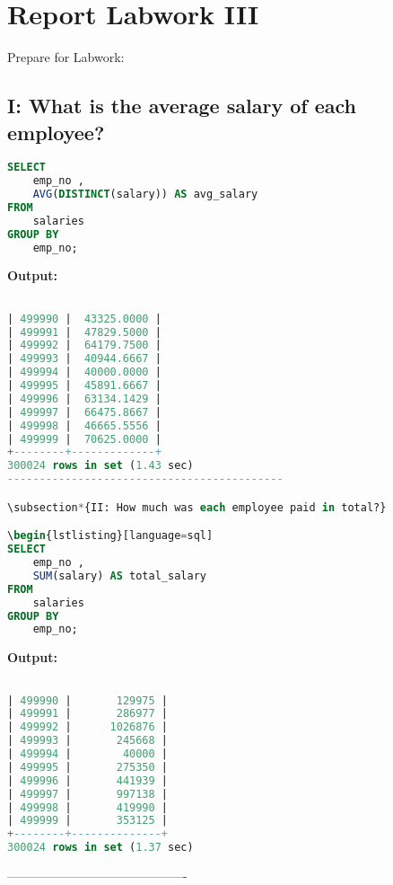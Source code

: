 \documentclass[12pt]{report}
\begin{document}
\section*{Report Labwork III}

Prepare for Labwork:

{\small
{}}


\subsection*{I: What is the average salary of each employee?}

\begin{lstlisting}[language=sql]
SELECT
	emp_no ,
	AVG(DISTINCT(salary)) AS avg_salary
FROM
	salaries
GROUP BY
	emp_no;
\end{lstlisting}
\textbf{Output:}

\begin{lstlisting}[language=sql]

| 499990 |  43325.0000 |
| 499991 |  47829.5000 |
| 499992 |  64179.7500 |
| 499993 |  40944.6667 |
| 499994 |  40000.0000 |
| 499995 |  45891.6667 |
| 499996 |  63134.1429 |
| 499997 |  66475.8667 |
| 499998 |  46665.5556 |
| 499999 |  70625.0000 |
+--------+-------------+
300024 rows in set (1.43 sec)
-------------------------------------------

\subsection*{II: How much was each employee paid in total?}

\begin{lstlisting}[language=sql]
SELECT
	emp_no ,
	SUM(salary) AS total_salary
FROM
	salaries
GROUP BY
	emp_no;

\end{lstlisting}
\textbf{Output:}

\begin{lstlisting}[language=sql]

| 499990 |       129975 |
| 499991 |       286977 |
| 499992 |      1026876 |
| 499993 |       245668 |
| 499994 |        40000 |
| 499995 |       275350 |
| 499996 |       441939 |
| 499997 |       997138 |
| 499998 |       419990 |
| 499999 |       353125 |
+--------+--------------+
300024 rows in set (1.37 sec)

\end{lstlisting}
-------------------------------------------
\end{document}
